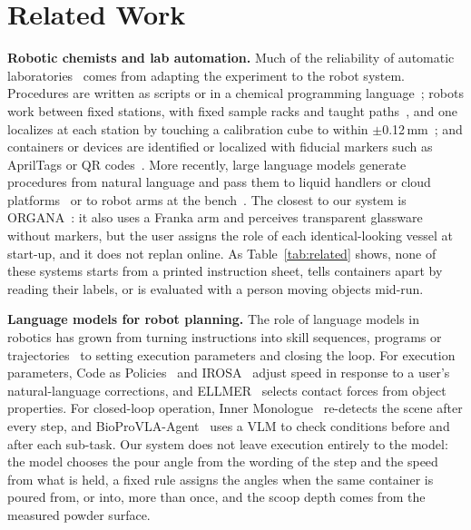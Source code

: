 \documentclass[letterpaper, 10pt, journal, twoside]{IEEEtran}}
\begin{document}
\section{Related Work}
\label{sec:related}

\textbf{Robotic chemists and lab automation.}
Much of the reliability of automatic laboratories~\cite{tom2024self}
comes from adapting the experiment to the robot system. Procedures are written as scripts or in a chemical programming language~\cite{steiner2019organic,mehr2020universal,fakhruldeen2022archemist};
robots work between fixed stations, with fixed sample racks and taught
paths~\cite{dai2024autonomous,lunt2024modular}, and one localizes at each
station by touching a calibration cube to within
$\pm$0.12\,mm~\cite{burger2020mobile}; and containers or devices are
identified or localized with fiducial markers such as AprilTags or QR
codes~\cite{yoshikawa2022chemistry,angers2025roboculture,vescovi2023modular}.
More recently, large language models generate procedures from natural
language and pass them to liquid handlers or cloud
platforms~\cite{boiko2023autonomous,bran2024augmenting} or to robot arms at
the bench~\cite{yoshikawa2023large,darvish2025organa,wei2026agentchemist,zhang2025robochemist}. The closest to our system is
ORGANA~\cite{darvish2025organa}: it also uses a Franka arm and perceives
transparent glassware without markers, but the user assigns the role of each
identical-looking vessel at start-up, and it does not replan online. As
Table~\ref{tab:related} shows, none of these systems starts from a printed
instruction sheet, tells containers apart by reading their labels, or is
evaluated with a person moving objects mid-run.


\textbf{Language models for robot planning.}
The role of language models in robotics has grown from turning
instructions into skill sequences, programs or
trajectories~\cite{ahn2022saycan,singh2023progprompt,liang2023code,huang2023voxposer}
to setting execution parameters and closing the loop. For execution
parameters, Code as Policies~\cite{liang2023code} and
IROSA~\cite{knauer2026irosa} adjust speed in response to a user's
natural-language corrections, and ELLMER~\cite{monwilliams2025embodied} selects contact
forces from object properties. For closed-loop operation, Inner
Monologue~\cite{huang2022inner} re-detects the scene after every step, and
BioProVLA-Agent~\cite{du2026bioprovla} uses a VLM to check conditions before
and after each sub-task. Our system does not leave execution entirely to the
model: the model chooses the pour angle from the wording of the step and the
speed from what is held, a fixed rule assigns the angles when the same
container is poured from, or into, more than once, and the scoop depth comes
from the measured powder surface.
\end{document}
